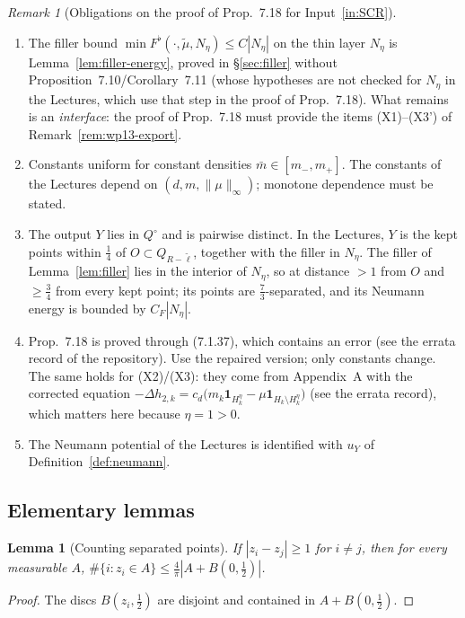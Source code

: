 \documentclass[11pt]{article}
\newtheorem{lemma}[theorem]{Lemma}
\theoremstyle{definition}
\theoremstyle{remark}
\newtheorem{remark}[theorem]{Remark}
\begin{document}
\begin{remark}[Obligations on the proof of Prop.~7.18 for Input~\ref{in:SCR}]\label{rem:scr-interface}
\begin{enumerate}[label=(\alph*)]
\item The filler bound $\min F^\flat(\cdot,\tilde\mu,N_\eta)\le C|N_\eta|$ on
  the thin layer $N_\eta$ is Lemma~\ref{lem:filler-energy}, proved in \S\ref{sec:filler} without
  Proposition~7.10/Corollary~7.11 (whose hypotheses are not checked for $N_\eta$ in the Lectures, which use that step in the proof of Prop.~7.18).
  What remains is an \emph{interface}:
  the proof of Prop.~7.18 must provide the items (X1)--(X3') of Remark~\ref{rem:wp13-export}.
\item Constants uniform for constant densities $\bar m\in[m_-,m_+]$. The constants of the Lectures depend on
  $(d,m,\|\mu\|_\infty)$; monotone dependence must be stated.
\item The output $Y$ lies in $Q^\circ$ and is pairwise distinct. In the Lectures, $Y$ is the kept
  points within $\tfrac14$ of $O\subset Q_{R-\tilde\ell}$, together with the filler in $N_\eta$.
  The filler of Lemma~\ref{lem:filler} lies in the interior of $N_\eta$, so at distance $>1$ from $O$
  and $\ge\tfrac34$ from every kept point; its points are $\tfrac73$-separated, and its Neumann
  energy is bounded by $C_F|N_\eta|$.
\item Prop.~7.18 is proved through (7.1.37), which contains an error (see the errata record of the repository). Use the repaired
  version; only constants change. The same holds
  for (X2)/(X3): they come from Appendix~A with the corrected equation
  $-\Delta h_{2,k}=c_d\bigl(m_k\mathbf 1_{H_k^\eta}-\mu\mathbf 1_{H_k\setminus H_k^\eta}\bigr)$
  (see the errata record), which matters here because $\eta=1>0$.
\item The Neumann potential of the Lectures is identified with $u_Y$ of Definition~\ref{def:neumann}.
\end{enumerate}
\end{remark}

\subsection{Elementary lemmas}

\begin{lemma}[Counting separated points]\label{lem:count}
If $|z_i-z_j|\ge1$ for $i\ne j$, then for every measurable $A$,
$\#\{i:z_i\in A\}\le\frac4\pi|A+B(0,\tfrac12)|$.
\end{lemma}
\begin{proof}
The discs $B(z_i,\tfrac12)$ are disjoint and contained in $A+B(0,\tfrac12)$.
\end{proof}
\end{document}
